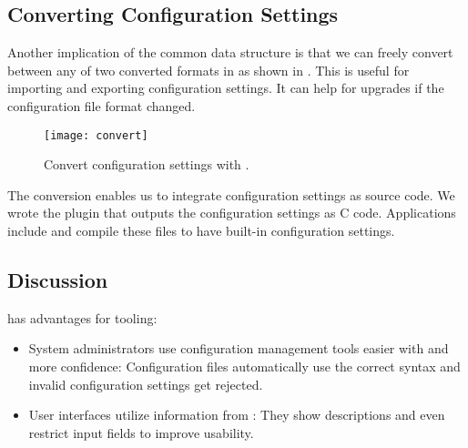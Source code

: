 \subsection{Converting Configuration Settings}

Another implication of the common data structure is that we can freely convert between any of two converted formats in \elektra{} as shown in .
This is useful for importing and exporting configuration settings.
It can help for upgrades if the configuration file format changed.

\begin{figure}[htp]
\centering
\texttt{[image: convert]}
\caption{Convert configuration settings with \elektra{}.}
\label{fig:convert}
\end{figure}

The conversion enables us to integrate configuration settings as source code.
We wrote the plugin  that outputs the configuration settings as C code.
Applications include and compile these files to have built-in configuration settings.


\subsection{Discussion}

\elektra{} has advantages for tooling:
\begin{itemize}
\item System administrators use configuration management tools easier with and more confidence:
Configuration files automatically use the correct syntax and invalid configuration settings get rejected.
\item User interfaces utilize information from :
They show descriptions and even restrict input fields to improve usability.
\end{itemize}

